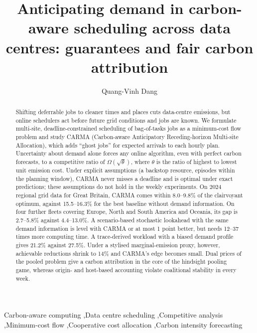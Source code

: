 \documentclass[preprint,12pt]{elsarticle}
\begin{document}
\begin{frontmatter}

\title{Anticipating demand in carbon-aware scheduling across data centres: guarantees and fair carbon attribution}

\author{Quang-Vinh Dang}

\begin{abstract}
Shifting deferrable jobs to cleaner times and places cuts data-centre emissions, but online schedulers act before future grid conditions and jobs are known. We formulate multi-site, deadline-constrained scheduling of bag-of-tasks jobs as a minimum-cost flow problem and study CARMA (Carbon-aware Anticipatory Receding-horizon Multi-site Allocation), which adds ``ghost jobs'' for expected arrivals to each hourly plan. Uncertainty about demand alone forces any online algorithm, even with perfect carbon forecasts, to a competitive ratio of $\Omega(\sqrt{\theta})$, where $\theta$ is the ratio of highest to lowest unit emission cost. Under explicit assumptions (a backstop resource, episodes within the planning window), CARMA never misses a deadline and is optimal under exact predictions; these assumptions do not hold in the weekly experiments. On 2024 regional grid data for Great Britain, CARMA comes within 8.0--9.8\% of the clairvoyant optimum, against 15.5--16.3\% for the best baseline without demand information. On four further fleets covering Europe, North and South America and Oceania, its gap is 2.7--5.8\% against 4.4--13.0\%. A scenario-based stochastic lookahead with the same demand information is level with CARMA or at most 1 point better, but needs 12--37 times more computing time. A trace-derived workload with a biased demand profile gives 21.2\% against 27.5\%. Under a stylised marginal-emission proxy, however, achievable reductions shrink to 14\% and CARMA's edge becomes small. Dual prices of the pooled problem give a carbon attribution in the core of the hindsight pooling game, whereas origin- and host-based accounting violate coalitional stability in every week.
\end{abstract}

\begin{keyword}
Carbon-aware computing \sep Data centre scheduling \sep Competitive analysis \sep Minimum-cost flow \sep Cooperative cost allocation \sep Carbon intensity forecasting
\end{keyword}

\end{frontmatter}
\end{document}

